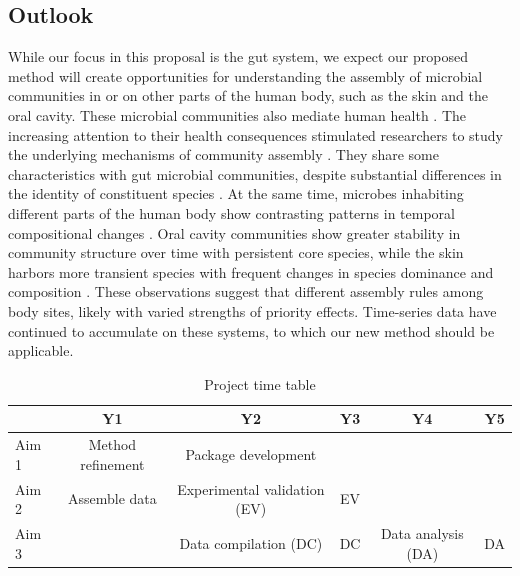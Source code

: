 \documentclass[12pt, class=article, crop=false]{standalone}
\begin{document}
\subsection*{Outlook}
While our focus in this proposal is the gut system, we expect our proposed method will create opportunities for understanding the assembly of microbial communities in or on other parts of the human body, such as the skin and the oral cavity.
These microbial communities also mediate human health \citep{fierer_animalcules_2012}.
The increasing attention to their health consequences stimulated researchers to study the underlying mechanisms of community assembly \citep{grice_topographical_2009, jakobsson_short-term_2010, costello_bacterial_2009, caporaso_moving_2011}.
They share some characteristics with gut microbial communities, despite substantial differences in the identity of constituent species \citep{costello_bacterial_2009}.
At the same time, microbes inhabiting different parts of the human body show contrasting patterns in temporal compositional changes \citep{costello_bacterial_2009, caporaso_moving_2011, fierer_animalcules_2012, jakobsson_short-term_2010}.
Oral cavity communities show greater stability in community structure over time with persistent core species, while the skin harbors more transient species with frequent changes in species dominance and composition \citep{costello_bacterial_2009}.
These observations suggest that different assembly rules among body sites, likely with varied strengths of priority effects.
Time-series data have continued to accumulate on these systems, to which our new method should be applicable.

\begin{table}
    \centering
    \caption{Project time table}
    \begin{tabular}{lccccc}
         & Y1 &  Y2 & Y3 & Y4 & Y5\\
         \hline
         Aim 1 & Method refinement & Package development & & & \\
         Aim 2 & Assemble data & Experimental validation (EV) & EV &  & \\
         Aim 3 & & Data compilation (DC) & DC & Data analysis (DA) & DA \\
    \end{tabular}
    \label{tab:tt}
\end{table}

\newpage


\end{document}
